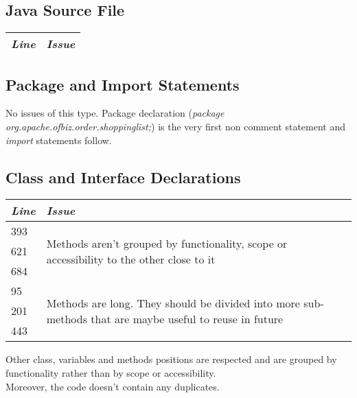 \documentclass[11pt,a4paper]{report}
\begin{document}
\subsection{Java Source File}
\begin{tabularx}{\textwidth}{|l|X|}
	\hline
	\textit{Line} & \textit{Issue}\\
	\hline
\end{tabularx}
\subsection{Package and Import Statements}
No issues of this type. Package declaration (\textit{package org.apache.ofbiz.order.shoppinglist;}) is the very first non comment statement and \textit{import} statements follow.
\subsection{Class and Interface Declarations}
\begin{tabularx}{\textwidth}{|l|X|}
	\hline
	\textit{Line} & \textit{Issue}\\
	\hline
	393 & \multirow{3}{\linewidth}{Methods aren't grouped by functionality, scope or accessibility to the other close to it}\\
	621 & \\
	684 & \\
	\hline
	95 & \multirow{3}{\linewidth}{Methods are long. They should be divided into more sub-methods that are maybe useful to reuse in future}\\
	201 & \\
	443 & \\
	\hline
\end{tabularx}
Other class, variables and methods positions are respected and are grouped by functionality rather than by scope or accessibility.\\Moreover, the code doesn't contain any duplicates.
\end{document}
